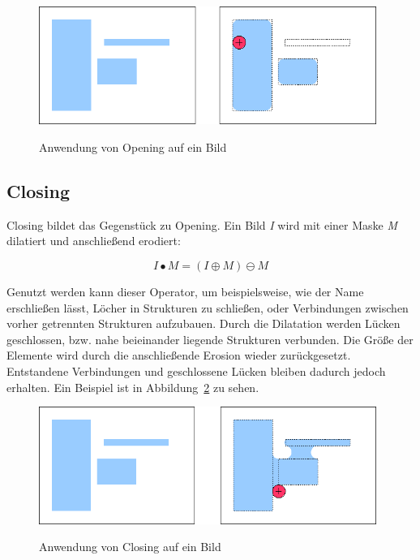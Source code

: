 \begin{figure}[ht]
   \centering
     \includegraphics[width=11cm]{Bilder/MorphologicalOpening} \\
 \caption{Anwendung von Opening auf ein Bild}
 \label{fig:Opening}
\end{figure}

\subsection{Closing}
Closing bildet das Gegenstück zu Opening.
Ein Bild {\em I} wird mit einer Maske {\em M} dilatiert und anschließend erodiert:

$$ I \bullet M = ( I \oplus M ) \ominus M $$

Genutzt werden kann dieser Operator, um beispielsweise, wie der Name erschließen lässt, Löcher in Strukturen zu schließen, oder Verbindungen zwischen vorher getrennten Strukturen aufzubauen.
Durch die Dilatation werden Lücken geschlossen, bzw. nahe beieinander liegende Strukturen verbunden. Die Größe der Elemente wird durch die anschließende Erosion wieder zurückgesetzt. Entstandene Verbindungen und geschlossene Lücken bleiben dadurch jedoch erhalten.
Ein Beispiel ist in Abbildung~\ref{fig:Closing} zu sehen.

\begin{figure}[ht]
   \centering
     \includegraphics[width=11cm]{Bilder/MorphologicalClosing} \\
 \caption{Anwendung von Closing auf ein Bild}
 \label{fig:Closing}
\end{figure}

